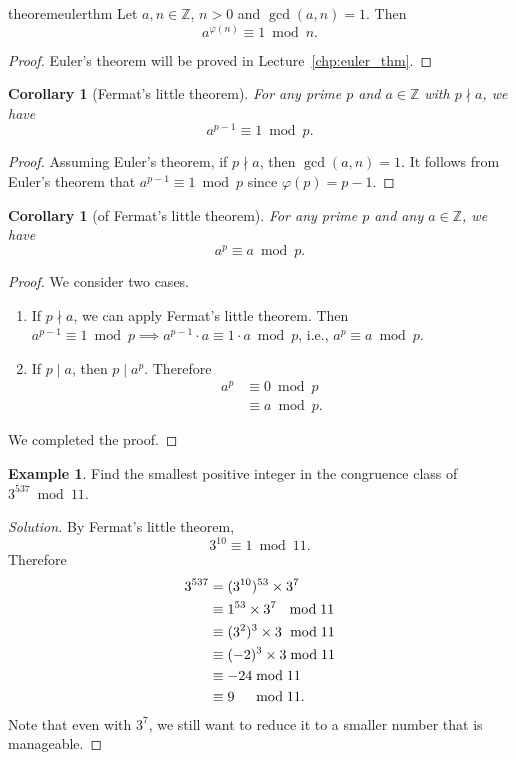 \documentclass{amsbook}
\theoremstyle{plain}
\newtheorem{corollary}[theorem]{Corollary}
\theoremstyle{definition}
\newtheorem{example}[theorem]{Example}
\theoremstyle{remark}
\numberwithin{equation}{chapter}
\numberwithin{figure}{chapter}
\newcommand{\Z}{\mathbb{Z}}
\begin{document}
\begin{restatable}{theorem}{eulerthm}\label{thm:euler_thm}
  Let $a, n \in \Z$, $n > 0$ and $\gcd (a, n) = 1$. Then
  \[
    a^{\varphi(n)} \equiv 1 \bmod n.
  \]
\end{restatable}
\begin{proof}
  Euler's theorem will be proved in Lecture~\ref{chp:euler_thm}.
\end{proof}
\begin{corollary}[Fermat's little theorem]
  For any prime $p$ and $a \in \Z$ with $p \nmid a$, we have
  \[
    a^{p-1} \equiv 1 \bmod p.
  \]
\end{corollary}
\begin{proof}
  Assuming Euler's theorem, if $p \nmid a$, then $\gcd(a, n) = 1$. It follows from Euler's theorem that $a^{p-1} \equiv 1 \bmod p$ since $\varphi(p) = p - 1$.
\end{proof}
\begin{corollary}[of Fermat's little theorem]
  For any prime $p$ and any $a \in \Z$, we have
  \[
    a^p \equiv a \bmod p.
  \]
\end{corollary}
\begin{proof}
  We consider two cases.
  \begin{enumerate}[label=(\roman*)]
  \item If $p \nmid a$, we can apply Fermat's little theorem. Then $a^{p-1} \equiv 1 \bmod p \implies a^{p-1}\cdot a \equiv 1\cdot a \bmod p$, i.e., $a^p \equiv a \bmod p$.
  \item If $p \mid a$, then $p \mid a^p$. Therefore
    \begin{align}
      a^p &\equiv 0 \bmod p \\
          &\equiv a \bmod p.
    \end{align}
  \end{enumerate}

  We completed the proof.
\end{proof}
\begin{example}
  Find the smallest positive integer in the congruence class of $3^{537} \bmod 11$.
\end{example}
\begin{proof}[Solution]
  By Fermat's little theorem,
  \[
    3^{10} \equiv 1 \bmod 11.
  \]
  Therefore
  \begin{align}
    3^{537} &= (3^{10})^{53} \times 3^7 \\
            &\equiv 1^{53} \times 3^7 \hspace{2.3mm}\bmod 11 \\
            &\equiv (3^2)^3 \times 3 \hspace{1.1mm}\bmod 11 \\
            &\equiv (-2)^3 \times 3 \bmod 11 \\
            &\equiv -24 \bmod 11 \\
            &\equiv 9 \hspace{4.5mm}\bmod 11.
  \end{align}
  Note that even with $3^7$, we still want to reduce it to a smaller number that is manageable.
\end{proof}
\end{document}
